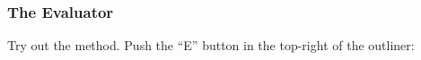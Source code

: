 \documentclass[letterpaper,10pt,english]{sphinxmanual}
\begin{document}
\subsubsection{The Evaluator}
\label{howtoprg:the-evaluator}
Try out the  method. Push the “E” button in the top-right of the outliner:
\begin{figure}[htbp]\begin{flushleft}

\end{flushleft}\end{figure}
\end{document}
